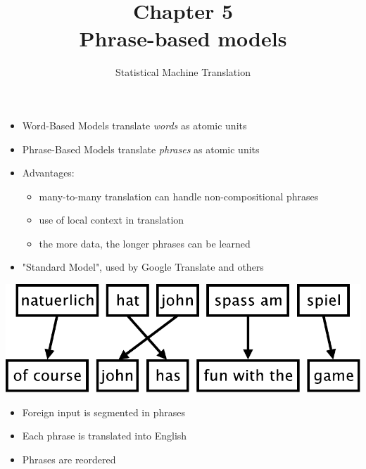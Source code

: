 \documentclass[landscape]{slides}
\begin{document}
\title[Chapter 5: Phrase-Based Models]{Chapter 5\\[1cm] Phrase-based models}
\author[Philipp Koehn]{}
\date{Statistical Machine Translation}

\maketitle

\begin{itemize} \vspace{10mm}
\item Word-Based Models translate {\em words} as atomic units
\item Phrase-Based Models translate {\em phrases} as atomic units
\item Advantages:
\begin{itemize}
\item many-to-many translation can handle non-compositional phrases
\item use of local context in translation
\item the more data, the longer phrases can be learned
\end{itemize}
\item "Standard Model", used by Google Translate and others
\end{itemize}


\begin{center} \vspace{15mm}
\includegraphics[scale=1.4]{phrase-model-alignment.pdf}
\end{center}\vspace{5mm}
\begin{itemize} \itemsep -1mm
\item Foreign input is segmented in phrases 
\item Each phrase is translated into English
\item Phrases are reordered
\end{itemize}
\end{document}
